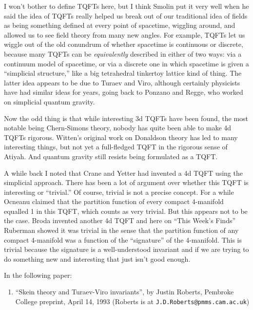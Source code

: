 \documentclass{article}
\def\tightlist{}
\begin{document}
I won't bother to define TQFTs here, but I think Smolin put it very well
when he said the idea of TQFTs really helped us break out of our
traditional idea of fields as being something defined at every point of
spacetime, wiggling around, and allowed us to see field theory from many
new angles. For example, TQFTs let us wiggle out of the old conundrum of
whether spacetime is continuous or discrete, because many TQFTs can be
\emph{equivalently} described in either of two ways: via a continuum
model of spacetime, or via a discrete one in which spacetime is given a
``simplicial structure,'' like a big tetrahedral tinkertoy lattice kind
of thing. The latter idea appears to be due to Turaev and Viro, although
certainly physicists have had similar ideas for years, going back to
Ponzano and Regge, who worked on simplicial quantum gravity.

Now the odd thing is that while interesting 3d TQFTs have been found,
the most notable being Chern-Simons theory, nobody has quite been able
to make 4d TQFTs rigorous. Witten's original work on Donaldson theory
has led to many interesting things, but not yet a full-fledged TQFT in
the rigorous sense of Atiyah. And quantum gravity still resists being
formulated as a TQFT.

A while back I noted that Crane and Yetter had invented a 4d TQFT using
the simplicial approach. There has been a lot of argument over whether
this TQFT is interesting or ``trivial.'' Of course, trivial is not a
precise concept. For a while Ocneanu claimed that the partition function
of every compact 4-manifold equalled 1 in this TQFT, which counts as
very trivial. But this appears not to be the case. Broda invented
another 4d TQFT and here on ``This Week's Finds'' Ruberman showed it was
trivial in the sense that the partition function of any compact
4-manifold was a function of the ``signature'' of the 4-manifold. This
is trivial because the signature is a well-understood invariant and if
we are trying to do something new and interesting that just isn't good
enough.

In the following paper:

\begin{enumerate}
\def\labelenumi{\arabic{enumi})}
\tightlist
\item
  ``Skein theory and Turaev-Viro invariants'', by Justin Roberts,
  Pembroke College preprint, April 14, 1993 (Roberts is at
  \texttt{J.D.Roberts@pmms.cam.ac.uk})
\end{enumerate}
\end{document}
